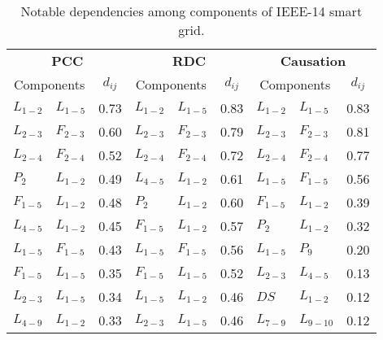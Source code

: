 \begin{table}[H]
\centering
\caption{Notable dependencies among components of IEEE-14 smart grid.}
\label{tab:d_ieee14}
\footnotesize
\setlength{\tabcolsep}{2pt}
\begin{tabular}{l@{ - }lc|l@{ - }lc|l@{ - }lc}
\multicolumn{3}{c}{\textbf{PCC}} & \multicolumn{3}{c}{\textbf{RDC}} & \multicolumn{3}{c}{\textbf{Causation}} \\
\multicolumn{2}{c}{Components} & $d_{ij}$ & \multicolumn{2}{c}{Components} & $d_{ij}$ & \multicolumn{2}{c}{Components} & $d_{ij}$ \\ \hline
$L_{1-2}$ & $L_{1-5}$ & 0.73 & $L_{1-2}$ & $L_{1-5}$ & 0.83 & $L_{1-2}$ & $L_{1-5}$  & 0.83 \\
$L_{2-3}$ & $F_{2-3}$ & 0.60 & $L_{2-3}$ & $F_{2-3}$ & 0.79 & $L_{2-3}$ & $F_{2-3}$  & 0.81 \\
$L_{2-4}$ & $F_{2-4}$ & 0.52 & $L_{2-4}$ & $F_{2-4}$ & 0.72 & $L_{2-4}$ & $F_{2-4}$  & 0.77 \\
$P_{2}$   & $L_{1-2}$ & 0.49 & $L_{4-5}$ & $L_{1-2}$ & 0.61 & $L_{1-5}$ & $F_{1-5}$  & 0.56 \\
$F_{1-5}$ & $L_{1-2}$ & 0.48 & $P_{2}$   & $L_{1-2}$ & 0.60 & $F_{1-5}$ & $L_{1-2}$  & 0.39 \\
$L_{4-5}$ & $L_{1-2}$ & 0.45 & $F_{1-5}$ & $L_{1-2}$ & 0.57 & $P_{2}$   & $L_{1-2}$  & 0.32 \\
$L_{1-5}$ & $F_{1-5}$ & 0.43 & $L_{1-5}$ & $F_{1-5}$ & 0.56 & $L_{1-5}$ & $P_{9}$    & 0.20 \\
$F_{1-5}$ & $L_{1-5}$ & 0.35 & $F_{1-5}$ & $L_{1-5}$ & 0.52 & $L_{2-3}$ & $L_{4-5}$  & 0.13 \\
$L_{2-3}$ & $L_{1-5}$ & 0.34 & $L_{1-5}$ & $L_{1-2}$ & 0.46 & $DS$      & $L_{1-2}$  & 0.12 \\
$L_{4-9}$ & $L_{1-2}$ & 0.33 & $L_{2-3}$ & $L_{1-5}$ & 0.46 & $L_{7-9}$ & $L_{9-10}$ & 0.12
\end{tabular}
\end{table}

